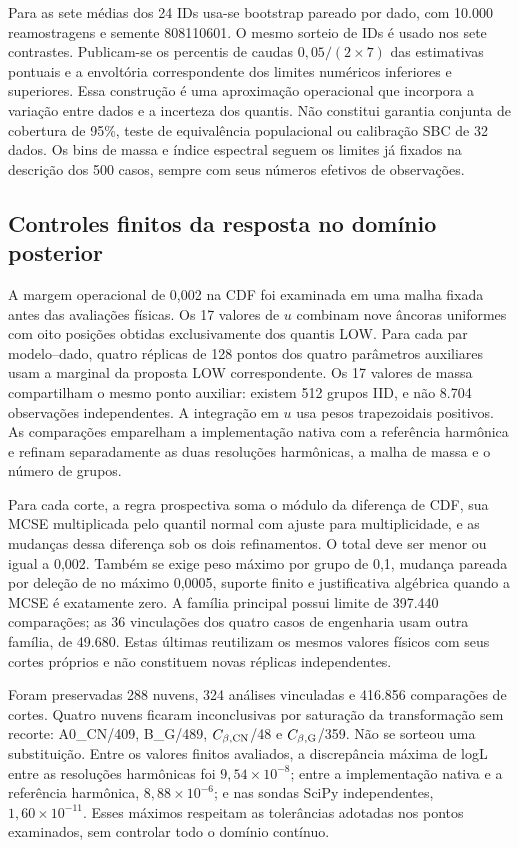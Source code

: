 Para as sete médias dos 24 IDs usa-se bootstrap pareado por dado, com
10.000 reamostragens e semente 808110601. O mesmo sorteio de IDs é usado
nos sete contrastes. Publicam-se os percentis de caudas $0,05/(2\times7)$
das estimativas pontuais e a envoltória correspondente dos limites
numéricos inferiores e superiores. Essa construção é uma aproximação
operacional que incorpora a variação entre dados e a incerteza dos
quantis. Não constitui garantia conjunta de cobertura de 95\%, teste de
equivalência populacional ou calibração SBC de 32 dados. Os bins de massa
e índice espectral seguem os limites já fixados na descrição dos 500
casos, sempre com seus números efetivos de observações.

\subsection{Controles finitos da resposta no domínio posterior}
\label{sec:comp-controles-finitos}

A margem operacional de 0,002 na CDF foi examinada em uma malha fixada
antes das avaliações físicas. Os 17 valores de $u$ combinam nove âncoras
uniformes com oito posições obtidas exclusivamente dos quantis LOW.
Para cada par modelo--dado, quatro réplicas de 128 pontos dos quatro
parâmetros auxiliares usam a marginal da proposta LOW correspondente.
Os 17 valores de massa compartilham o mesmo ponto auxiliar: existem
512 grupos IID, e não 8.704 observações independentes. A integração em
$u$ usa pesos trapezoidais positivos. As comparações emparelham a
implementação nativa com a referência harmônica e refinam separadamente
as duas resoluções harmônicas, a malha de massa e o número de grupos.

Para cada corte, a regra prospectiva soma o módulo da diferença de CDF,
sua MCSE multiplicada pelo quantil normal com ajuste para multiplicidade,
e as mudanças dessa diferença sob os dois refinamentos. O total deve
ser menor ou igual a 0,002. Também se exige peso máximo por grupo de
0,1, mudança pareada por deleção de no máximo 0,0005, suporte finito e
justificativa algébrica quando a MCSE é exatamente zero. A família
principal possui limite de 397.440 comparações; as 36 vinculações dos
quatro casos de engenharia usam outra família, de 49.680. Estas últimas
reutilizam os mesmos valores físicos com seus cortes próprios e não
constituem novas réplicas independentes.

Foram preservadas 288 nuvens, 324 análises vinculadas e 416.856
comparações de cortes. Quatro nuvens ficaram inconclusivas por saturação
da transformação sem recorte: A0\_CN/409, B\_G/489,
$C_{\beta,\rm CN}$/48 e $C_{\beta,\rm G}$/359. Não se sorteou uma
substituição. Entre os valores finitos avaliados, a discrepância máxima
de logL entre as resoluções harmônicas foi $9{,}54\times10^{-8}$;
entre a implementação nativa e a referência harmônica,
$8{,}88\times10^{-6}$; e nas sondas SciPy independentes,
$1{,}60\times10^{-11}$. Esses máximos respeitam as tolerâncias adotadas
nos pontos examinados, sem controlar todo o domínio contínuo.

